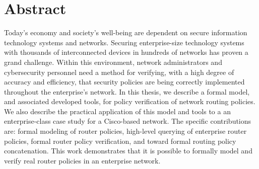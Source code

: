 \documentclass[12pt,letterpaper]{report}
\begin{document}
\section*{\large{Abstract}}

%

Today's economy and society's well-being are dependent on secure information technology systems and networks. Securing enterprise-size technology systems with thousands of interconnected devices in hundreds of networks has proven a grand challenge. Within this environment, network administrators and cybersecurity personnel need a method for verifying, with a high degree of accuracy and efficiency, that security policies are being correctly implemented throughout the enterprise's network. In this thesis, we describe a formal model, and associated developed tools, for policy verification of network routing policies. We also describe the practical application of this model and tools to a an enterprise-class case study for a Cisco-based network. The specific contributions are: formal modeling of router policies, high-level querying of enterprise router policies, formal router policy verification, and toward formal routing policy concatenation. This work demonstrates that it is possible to formally model and verify real router policies in an enterprise network.
\pagebreak
\end{document}
